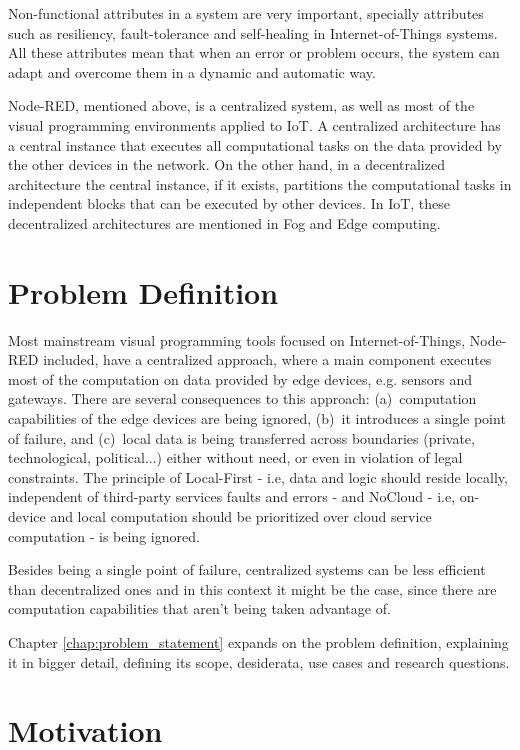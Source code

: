 Non-functional attributes in a system are very important, specially attributes such as resiliency, fault-tolerance and self-healing in Internet-of-Things systems. All these attributes mean that when an error or problem occurs, the system can adapt and overcome them in a dynamic and automatic way.

Node-RED, mentioned above, is a centralized system, as well as most of the visual programming environments applied to IoT. A centralized architecture has a central instance that executes all computational tasks on the data provided by the other devices in the network. On the other hand, in a decentralized architecture the central instance, if it exists, partitions the computational tasks in independent blocks that can be executed by other devices. In IoT, these decentralized architectures are mentioned in Fog and Edge computing.

\section{Problem Definition} \label{sec:problem_definition}

Most mainstream visual programming tools focused on Internet-of-Things, Node-RED included, have a centralized approach, where a main component executes most of the computation on data provided by edge devices, e.g. sensors and gateways. There are several consequences to this approach: (a)~computation capabilities of the edge devices are being ignored, (b)~it introduces a single point of failure, and (c)~local data is being transferred across boundaries (private, technological, political...) either without need, or even in violation of legal constraints. The principle of Local-First \cite{localfist} - i.e, data and logic should reside locally, independent of third-party services faults and errors - and NoCloud \cite{nocloud} - i.e, on-device and local computation should be prioritized over cloud service computation - is being ignored. 

Besides being a single point of failure, centralized systems can be less efficient than decentralized ones and in this context it might be the case, since there are computation capabilities that aren't being taken advantage of.

Chapter \ref{chap:problem_statement} expands on the problem definition, explaining it in bigger detail, defining its scope, desiderata, use cases and research questions.

\section{Motivation} \label{sec:motivation}

